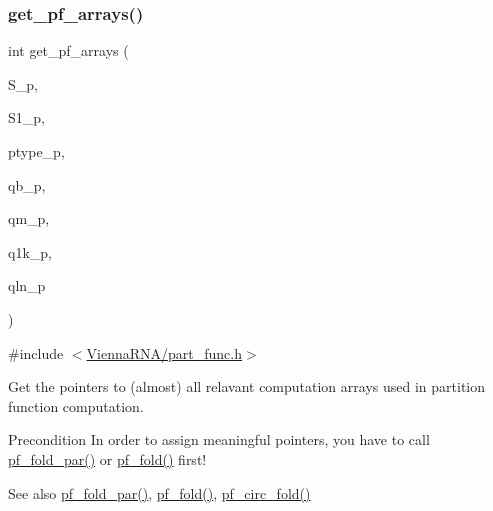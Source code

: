 \subsubsection{\texorpdfstring{get\+\_\+pf\+\_\+arrays()}{get\_pf\_arrays()}}
{\footnotesize\ttfamily int get\+\_\+pf\+\_\+arrays (\begin{DoxyParamCaption}\item[{short $\ast$$\ast$}]{S\+\_\+p,  }\item[{short $\ast$$\ast$}]{S1\+\_\+p,  }\item[{char $\ast$$\ast$}]{ptype\+\_\+p,  }\item[{\mbox{\hyperlink{group__data__structures_ga31125aeace516926bf7f251f759b6126}{F\+L\+T\+\_\+\+O\+R\+\_\+\+D\+BL}} $\ast$$\ast$}]{qb\+\_\+p,  }\item[{\mbox{\hyperlink{group__data__structures_ga31125aeace516926bf7f251f759b6126}{F\+L\+T\+\_\+\+O\+R\+\_\+\+D\+BL}} $\ast$$\ast$}]{qm\+\_\+p,  }\item[{\mbox{\hyperlink{group__data__structures_ga31125aeace516926bf7f251f759b6126}{F\+L\+T\+\_\+\+O\+R\+\_\+\+D\+BL}} $\ast$$\ast$}]{q1k\+\_\+p,  }\item[{\mbox{\hyperlink{group__data__structures_ga31125aeace516926bf7f251f759b6126}{F\+L\+T\+\_\+\+O\+R\+\_\+\+D\+BL}} $\ast$$\ast$}]{qln\+\_\+p }\end{DoxyParamCaption})}



{\ttfamily \#include $<$\mbox{\hyperlink{part__func_8h}{Vienna\+R\+N\+A/part\+\_\+func.\+h}}$>$}



Get the pointers to (almost) all relavant computation arrays used in partition function computation. 

\begin{DoxyPrecond}{Precondition}
In order to assign meaningful pointers, you have to call \mbox{\hyperlink{group__pf__fold_gac4f95bee734b2563a3d6e9932117ebdf}{pf\+\_\+fold\+\_\+par()}} or \mbox{\hyperlink{group__pf__fold_gadc3db3d98742427e7001a7fd36ef28c2}{pf\+\_\+fold()}} first! 
\end{DoxyPrecond}
\begin{DoxySeeAlso}{See also}
\mbox{\hyperlink{group__pf__fold_gac4f95bee734b2563a3d6e9932117ebdf}{pf\+\_\+fold\+\_\+par()}}, \mbox{\hyperlink{group__pf__fold_gadc3db3d98742427e7001a7fd36ef28c2}{pf\+\_\+fold()}}, \mbox{\hyperlink{group__pf__fold_ga819ce5fca8984004ac81c4a3b04cb735}{pf\+\_\+circ\+\_\+fold()}} 
\end{DoxySeeAlso}

